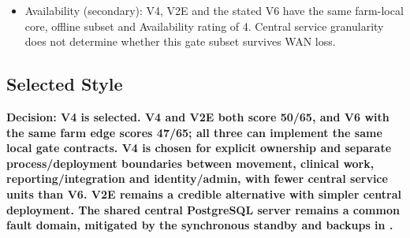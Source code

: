 \begin{itemize}
\begin{itemize}
    \item V5 carries authorization/evidence context across asynchronous chains. V6 receives Security/Auditability 3 because its finer central boundaries add policy propagation, evidence correlation and review effort. It can satisfy the same mandatory controls; this rating assesses project fit, not permission correctness or audit loss already observed in an implementation.
  \end{itemize}
  \item Availability (secondary): V4, V2E and the stated V6 have the same farm-local core, offline subset and Availability rating of 4. Central service granularity does not determine whether this gate subset survives WAN loss.
\end{itemize}


\subsection{Selected Style}\label{sec:4.3}

\textbf{Decision: V4 is selected. V4 and V2E both score 50/65, and V6
with the same farm edge scores 47/65; all three can implement the same
local gate contracts. V4 is chosen for explicit ownership and separate
process/deployment boundaries between movement, clinical work,
reporting/integration and identity/admin, with fewer central service
units than V6. V2E remains a credible alternative with simpler central
deployment. The shared central PostgreSQL server remains a common fault
domain, mitigated by the synchronous standby and backups in
.}


